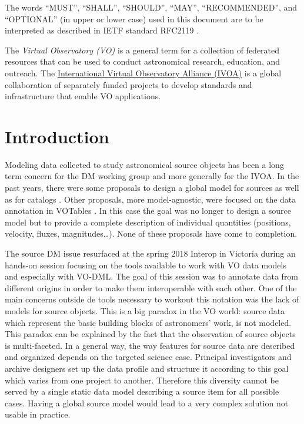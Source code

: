 \documentclass[11pt,a4paper]{ivoa}
\begin{document}
The words ``MUST'', ``SHALL'', ``SHOULD'', ``MAY'', ``RECOMMENDED'', and
``OPTIONAL'' (in upper or lower case) used in this document are to be
interpreted as described in IETF standard RFC2119 \citep{std:RFC2119}.

The \emph{Virtual Observatory (VO)} is a
general term for a collection of federated resources that can be used
to conduct astronomical research, education, and outreach.
The \href{http://www.ivoa.net}{International
Virtual Observatory Alliance (IVOA)} is a global
collaboration of separately funded projects to develop standards and
infrastructure that enable VO applications.


\section{Introduction}

Modeling data collected to study astronomical source objects has been a long term concern for the DM working group and more generally for the IVOA.
In the past years, there were some proposals to design a global model for sources \citep{wd:jesusdm} as well as for catalogs \citep{wd:catalog}.
Other proposals, more model-agnostic, were focused on the data annotation in VOTables \citep{note:stcvot} \citep{note:seb}. 
In this case the goal was no longer to design a source model but to provide a complete description of  individual quantities (positions, velocity, fluxes, magnitudes…).
None of these proposals have come to completion.

The source DM issue resurfaced at the spring 2018 Interop in Victoria during an hands-on session focusing on the tools available to work with VO data models and especially with VO-DML. 
The goal of this session was to annotate data from different origins in order to make them interoperable with each other.
One of the main concerns outside de tools necessary to workout this notation was the lack of models for source objects.
This is a big paradox in the VO world: source data which represent the basic building blocks of astronomers' work, is not modeled. 
This paradox can be explained by the fact that the observation of source objects is multi-faceted.
In a general way, the way features for source data are described and organized depends on the targeted science case. 
Principal investigators and archive designers set up the data profile and structure it according to this goal which varies from one project to another. 
Therefore this diversity cannot be served by a single static data model describing a source item for all possible cases.
Having a global source model would lead to a very complex solution not usable in practice.
\end{document}
